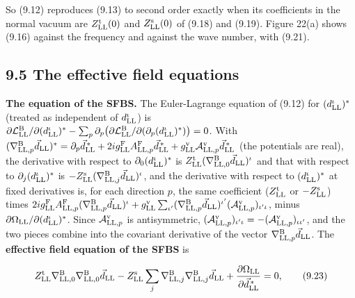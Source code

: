 \documentclass[
  10pt,
]{article}
\begin{document}
So (9.12) reproduces (9.13) to second order exactly when its
coefficients in the normal vacuum are \(Z^{\rm t}_{\rm LL}(0)\) and
\(Z^{\rm s}_{\rm LL}(0)\) of (9.18) and (9.19). Figure 22(a) shows
(9.16) against the frequency and against the wave number, with (9.21).

\hypertarget{the-effective-field-equations}{%
\subsection{9.5 The effective field
equations}\label{the-effective-field-equations}}

\textbf{The equation of the SFBS.} The Euler-Lagrange equation of (9.12)
for \((d^\iota_{\rm LL})^*\) (treated as independent of
\(d^\iota_{\rm LL}\)) is
\(\partial\mathcal L^{\rm B}_{\rm LL}/\partial(d^\iota_{\rm LL})^*-\sum_p\partial_p\big(\partial\mathcal L^{\rm B}_{\rm LL}/\partial(\partial_p(d^\iota_{\rm LL})^*)\big)=0\).
With
\((\nabla^{\rm B}_{{\rm LL},p}\vec d_{\rm LL})^*=\partial_p\vec d^{\,*}_{\rm LL}+2ig^{\rm F}_{\rm LL}A^{\rm F}_{{\rm LL},p}\vec d^{\,*}_{\rm LL}+g^{\rm v}_{\rm LL}\mathcal A^{\rm v}_{{\rm LL},p}\vec d^{\,*}_{\rm LL}\)
(the potentials are real), the derivative with respect to
\(\partial_0(d^\iota_{\rm LL})^*\) is
\(Z^{\rm t}_{\rm LL}(\nabla^{\rm B}_{{\rm LL},0}\vec d_{\rm LL})^\iota\)
and that with respect to \(\partial_j(d^\iota_{\rm LL})^*\) is
\(-Z^{\rm s}_{\rm LL}(\nabla^{\rm B}_{{\rm LL},j}\vec d_{\rm LL})^\iota\),
and the derivative with respect to \((d^\iota_{\rm LL})^*\) at fixed
derivatives is, for each direction \(p\), the same coefficient
(\(Z^{\rm t}_{\rm LL}\) or \(-Z^{\rm s}_{\rm LL}\)) times
\(2ig^{\rm F}_{\rm LL}A^{\rm F}_{{\rm LL},p}(\nabla^{\rm B}_{{\rm LL},p}\vec d_{\rm LL})^\iota+g^{\rm v}_{\rm LL}\sum_{\iota'}(\nabla^{\rm B}_{{\rm LL},p}\vec d_{\rm LL})^{\iota'}(\mathcal A^{\rm v}_{{\rm LL},p})_{\iota'\iota}\),
minus \(\partial\Omega_{\rm LL}/\partial(d^\iota_{\rm LL})^*\). Since
\(\mathcal A^{\rm v}_{{\rm LL},p}\) is antisymmetric,
\((\mathcal A^{\rm v}_{{\rm LL},p})_{\iota'\iota}=-(\mathcal A^{\rm v}_{{\rm LL},p})_{\iota\iota'}\),
and the two pieces combine into the covariant derivative of the vector
\(\nabla^{\rm B}_{{\rm LL},p}\vec d_{\rm LL}\). The \textbf{effective
field equation of the SFBS} is

\[Z^{\rm t}_{\rm LL}\nabla^{\rm B}_{{\rm LL},0}\nabla^{\rm B}_{{\rm LL},0}\vec d_{\rm LL}-Z^{\rm s}_{\rm LL}\sum_j\nabla^{\rm B}_{{\rm LL},j}\nabla^{\rm B}_{{\rm LL},j}\vec d_{\rm LL}+\frac{\partial\Omega_{\rm LL}}{\partial\vec d^{\,*}_{\rm LL}}=0,\tag{9.23}\]
\end{document}
